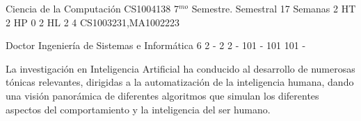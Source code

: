 \documentclass[a4paper,8pt]{article}
\begin{document}
\setNombreProfesor{}
\setGradoProfesorAbreviado{}
\sylabusHeader

\academicaTable
{Ciencia de la Computación} %
{CS1004138} %
{7$^{mo}$ Semestre.} %
{Semestral} %
{17 Semanas} %
{2 HT} %
{2 HP} %
{0} %
{2 HL}  %
{2} %
{4} %
{CS1003231,MA1002223} %

\administrativaTable
{Doctor} %
{Ingeniería de Sistemas e Informática} %
{6} %
{2} %
{-} %
{2} %
{2} %
{-} %
{101} %
{-} %
{101} %
{101} %
{-} %


\begin{fundamentacion}
La investigación en Inteligencia Artificial ha conducido al desarrollo de
numerosas tónicas relevantes, dirigidas a la automatización de la
inteligencia humana, dando una visión panorámica de diferentes
algoritmos que simulan los diferentes aspectos del comportamiento
y la inteligencia del ser humano.

\end{fundamentacion}

\begin{sumilla}
\item \ISFundamentalIssues
\item \ISBasicSearchStrategies
\item \ISBasicKnowledgeRepresentationandReasoning
\item \ISAdvancedSearch
\item \ISAdvancedRepresentationandReasoning
\item \ISAgents
\item \ISNaturalLanguageProcessing
\item \ISBasicMachineLearning
\item \ISRobotics
\item \ISPerceptionandComputerVision

\end{sumilla}
\end{document}
